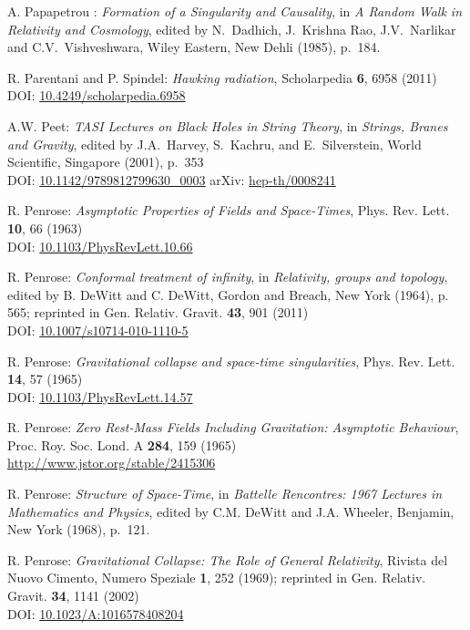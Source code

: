 \begin{thebibliography}{123}
A. Papapetrou : {\em Formation of a Singularity and Causality},
in {\em A Random Walk in Relativity and Cosmology},
edited by N.~Dadhich, J.~Krishna Rao, J.V.~Narlikar and C.V.~Vishveshwara,
Wiley Eastern, New Dehli (1985), p.~184.

R. Parentani and P. Spindel:
{\em Hawking radiation},
Scholarpedia {\bf 6}, 6958 (2011)\\
DOI: \href{https://doi.org/10.4249/scholarpedia.6958}{10.4249/scholarpedia.6958}

A.W. Peet:
{\em TASI Lectures on Black Holes in String Theory},
in {\em Strings, Branes and Gravity}, edited by
J.A.~Harvey, S.~Kachru, and E.~Silverstein,
World Scientific, Singapore (2001), p.~353\\
DOI: \href{https://doi.org/10.1142/9789812799630_0003}{10.1142/9789812799630\_0003}\hfill
arXiv: \href{https://arxiv.org/abs/hep-th/0008241}{hep-th/0008241}

R. Penrose: {\em Asymptotic Properties of Fields and Space-Times},
Phys. Rev. Lett. {\bf 10}, 66 (1963)\\
DOI: \href{https://doi.org/10.1103/PhysRevLett.10.66}{10.1103/PhysRevLett.10.66}

R. Penrose: {\em Conformal treatment of infinity}, in {\em Relativity, groups and topology},
edited by B. DeWitt and C. DeWitt,
Gordon and Breach, New York (1964), p. 565; reprinted in
Gen. Relativ. Gravit. {\bf 43}, 901 (2011)\\
DOI: \href{https://doi.org/10.1007/s10714-010-1110-5}{10.1007/s10714-010-1110-5}

R. Penrose: {\em Gravitational collapse and space-time singularities},
Phys. Rev. Lett. {\bf 14}, 57 (1965)\\
DOI: \href{https://doi.org/10.1103/PhysRevLett.14.57}{10.1103/PhysRevLett.14.57}

R. Penrose:
{\em Zero Rest-Mass Fields Including Gravitation: Asymptotic Behaviour},
Proc. Roy. Soc. Lond. A {\bf 284}, 159 (1965)\\
\url{http://www.jstor.org/stable/2415306}

R. Penrose: {\em Structure of Space-Time},
in {\em Battelle Rencontres: 1967 Lectures in Mathematics and Physics},
edited by C.M. DeWitt and J.A. Wheeler,
Benjamin, New York (1968), p.~121.

R. Penrose: {\em Gravitational Collapse: The Role of General Relativity},
Rivista del Nuovo Cimento, Numero Speziale {\bf 1}, 252 (1969); reprinted in
Gen. Relativ. Gravit. {\bf 34}, 1141 (2002)\\
DOI: \href{https://doi.org/10.1023/A:1016578408204}{10.1023/A:1016578408204}


\end{thebibliography}
